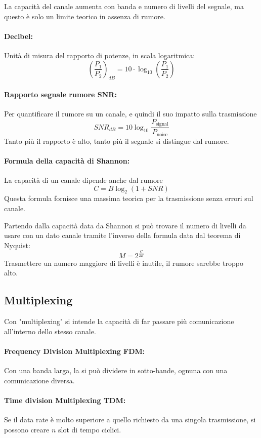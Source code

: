 La capacità del canale aumenta con banda e numero di livelli del segnale, ma questo è solo un limite teorico in assenza di rumore.

\paragraph{Decibel:} Unità di misura del rapporto di potenze, in scala logaritmica:
$$ \left(\frac{P_1}{P_2}\right)_{dB} = 10 \cdot \log_{10} \left(\frac{P_1}{P_2}\right)$$

\paragraph{Rapporto segnale rumore SNR:} Per quantificare il rumore su un canale, e quindi il suo impatto sulla trasmissione
$$ SNR_{dB} = 10 \log_{10} \frac{P_\text{signal}}{P_\text{noise}}$$
Tanto più il rapporto è alto, tanto più il segnale si distingue dal rumore.

\paragraph{Formula della capacità di Shannon:} La capacità di un canale dipende anche dal rumore
$$ C = B \log_2 (1 + SNR) $$
Questa formula fornisce una massima teorica per la trasmissione senza errori sul canale.

Partendo dalla capacità data da Shannon si può trovare il numero di livelli da usare con un dato canale tramite l'inverso della formula data dal teorema di Nyquist:
$$ M = 2^{\frac{C}{2B}}$$
Trasmettere un numero maggiore di livelli è inutile, il rumore sarebbe troppo alto.

\subsection{Multiplexing}

Con "multiplexing" si intende la capacità di far passare più comunicazione all'interno dello stesso canale.

\paragraph{Frequency Division Multiplexing FDM:} Con una banda larga, la si può dividere in sotto-bande, ognuna con una comunicazione diversa.

\paragraph{Time division Multiplexing TDM:} Se il data rate è molto superiore a quello richiesto da una singola trasmissione, si possono creare $n$ slot di tempo ciclici.

